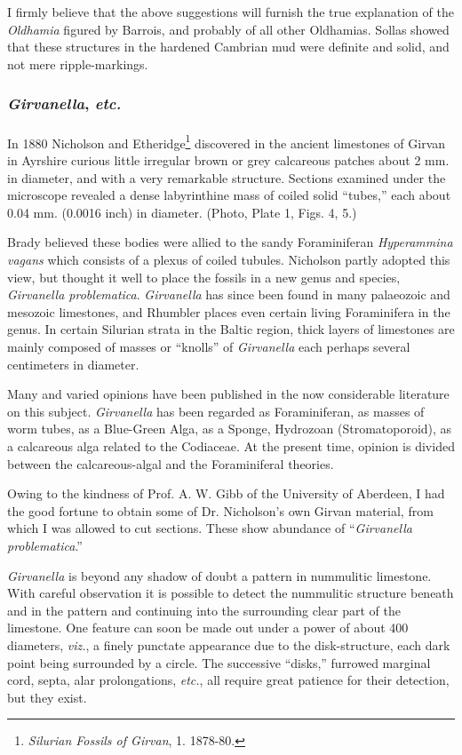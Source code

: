 \documentclass[a4paper, 12pt, oneside]{article}
\begin{document}
I firmly believe that the above suggestions will furnish the true explanation of the \emph{Oldhamia} figured by Barrois, and probably of all other Oldhamias. Sollas showed that these structures in the hardened Cambrian mud were definite and solid, and not mere ripple-markings.

\subsubsection{\emph{Girvanella}, \emph{etc.}}
\paragraph{}
In 1880 Nicholson and Etheridge\footnote{\emph{Silurian Fossils of Girvan}, 1. 1878-80.} discovered in the ancient limestones of Girvan in Ayrshire curious little irregular brown or grey calcareous patches about 2 mm. in diameter, and with a very remarkable structure. Sections examined under the microscope revealed a dense labyrinthine mass of coiled solid ``tubes,'' each about 0.04 mm. (0.0016 inch) in diameter. (Photo, Plate 1, Figs. 4, 5.)

Brady believed these bodies were allied to the sandy Foraminiferan \emph{Hyperammina vagans} which consists of a plexus of coiled tubules. Nicholson partly adopted this view, but thought it well to place the fossils in a new genus and species, \emph{Girvanella problematica}. \emph{Girvanella} has since been found in many palaeozoic and mesozoic limestones, and Rhumbler places even certain living Foraminifera in the genus. In certain Silurian strata in the Baltic region, thick layers of limestones are mainly composed of masses or ``knolls'' of \emph{Girvanella} each perhaps several centimeters in diameter.

Many and varied opinions have been published in the now considerable literature on this subject. \emph{Girvanella} has been regarded as Foraminiferan, as masses of worm tubes, as a Blue-Green Alga, as a Sponge, Hydrozoan (Stromatoporoid), as a calcareous alga related to the Codiaceae. At the present time, opinion is divided between the calcareous-algal and the Foraminiferal theories.

Owing to the kindness of Prof. A. W. Gibb of the University of Aberdeen, I had the good fortune to obtain some of Dr. Nicholson's own Girvan material, from which I was allowed to cut sections. These show abundance of ``\emph{Girvanella problematica}.''

\emph{Girvanella} is beyond any shadow of doubt a pattern in nummulitic limestone. With careful observation it is possible to detect the nummulitic structure beneath and in the pattern and continuing into the surrounding clear part of the limestone. One feature can soon be made out under a power of about 400 diameters, \emph{viz.}, a finely punctate appearance due to the disk-structure, each dark point being surrounded by a circle. The successive ``disks,'' furrowed marginal cord, septa, alar prolongations, \emph{etc.}, all require great patience for their detection, but they exist.
\end{document}
